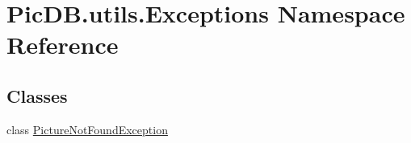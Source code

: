 \hypertarget{namespace_pic_d_b_1_1utils_1_1_exceptions}{}\section{Pic\+D\+B.\+utils.\+Exceptions Namespace Reference}
\label{namespace_pic_d_b_1_1utils_1_1_exceptions}
\subsection*{Classes}
\begin{DoxyCompactItemize}
\item 
class \mbox{\hyperlink{class_pic_d_b_1_1utils_1_1_exceptions_1_1_picture_not_found_exception}{Picture\+Not\+Found\+Exception}}
\end{DoxyCompactItemize}
